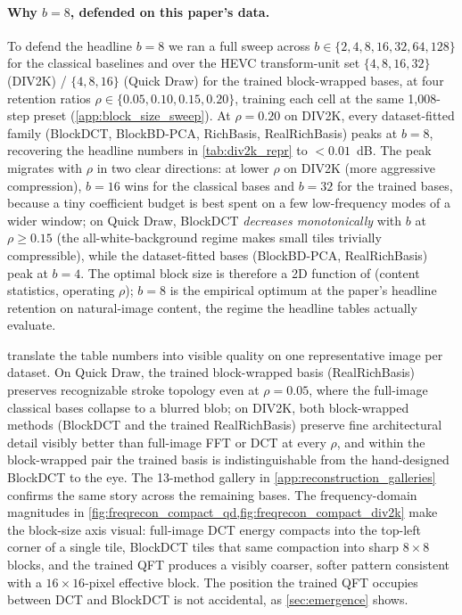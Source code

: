 \documentclass[a4paper, twocolumn]{quantumarticle}
\begin{document}
\paragraph{Why $b = 8$, defended on this paper's data.}
To defend the headline $b = 8$ we ran a full sweep across $b \in \{2, 4, 8, 16, 32, 64, 128\}$ for the classical baselines and over the HEVC transform-unit set $\{4, 8, 16, 32\}$ (DIV2K) / $\{4, 8, 16\}$ (Quick Draw) for the trained block-wrapped bases, at four retention ratios $\rho \in \{0.05, 0.10, 0.15, 0.20\}$, training each cell at the same 1{,}008-step preset (\cref{app:block_size_sweep}).
At $\rho = 0.20$ on DIV2K, every dataset-fitted family (BlockDCT, BlockBD-PCA, RichBasis, RealRichBasis) peaks at $b = 8$, recovering the headline numbers in \cref{tab:div2k_repr} to $< 0.01$~dB.
The peak migrates with $\rho$ in two clear directions: at lower $\rho$ on DIV2K (more aggressive compression), $b = 16$ wins for the classical bases and $b = 32$ for the trained bases, because a tiny coefficient budget is best spent on a few low-frequency modes of a wider window; on Quick Draw, BlockDCT \emph{decreases monotonically} with $b$ at $\rho \ge 0.15$ (the all-white-background regime makes small tiles trivially compressible), while the dataset-fitted bases (BlockBD-PCA, RealRichBasis) peak at $b = 4$.
The optimal block size is therefore a 2D function of (content statistics, operating $\rho$); $b = 8$ is the empirical optimum at the paper's headline retention on natural-image content, the regime the headline tables actually evaluate.


 translate the table numbers into visible quality on one representative image per dataset.
On Quick Draw, the trained block-wrapped basis (RealRichBasis) preserves recognizable stroke topology even at $\rho = 0.05$, where the full-image classical bases collapse to a blurred blob; on DIV2K, both block-wrapped methods (BlockDCT and the trained RealRichBasis) preserve fine architectural detail visibly better than full-image FFT or DCT at every $\rho$, and within the block-wrapped pair the trained basis is indistinguishable from the hand-designed BlockDCT to the eye.
The 13-method gallery in \cref{app:reconstruction_galleries} confirms the same story across the remaining bases.
The frequency-domain magnitudes in \cref{fig:freqrecon_compact_qd,fig:freqrecon_compact_div2k} make the block-size axis visual: full-image DCT energy compacts into the top-left corner of a single tile, BlockDCT tiles that same compaction into sharp $8 \times 8$ blocks, and the trained QFT produces a visibly coarser, softer pattern consistent with a $16 \times 16$-pixel effective block.
The position the trained QFT occupies between DCT and BlockDCT is not accidental, as \cref{sec:emergence} shows.
\end{document}
